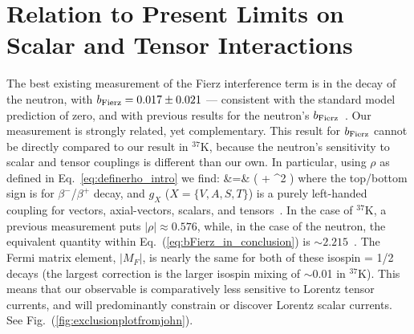 \section{Relation to Present Limits on Scalar and Tensor Interactions}
\label{sec:scalartensorlimits}
\label{sec:relation_to_other_measurements}
The best existing measurement of the Fierz interference term is in the decay of the neutron, with
\mbox{$b_{\mathrm{Fierz}} = 0.017 \pm 0.021$} --- consistent with the standard model prediction of zero, and with previous results for the neutron's $b_{\mathrm{Fierz}}$~\cite{Saul2020}\cite{UCNAfierz2020}. Our measurement is strongly related, yet complementary.  
%
This result for $b_{\mathrm{Fierz}}$ cannot be directly compared to our result in $^{37}$K, because the neutron's sensitivity to scalar and tensor couplings is different than our own.  In particular, using $\rho$ as defined in Eq.~\ref{eq:definerho_intro}
we find:
%
\bea
\bFierz &=&  \left(  + \rho^2  \right)
\label{eq:bFierz_in_conclusion}
\eea
where the top/bottom sign is for $\beta^-$/$\beta^+$ decay, and $g_X$ ($X = \{ V,A,S,T\} $) is a purely left-handed coupling for vectors, axial-vectors, scalars, and tensors~\cite{jtw}\cite{jtw_coulomb}.
In the case of $^{37}$K, a previous measurement puts $ | \rho | \approx 0.576 $, while, in the case of the neutron, the equivalent quantity within Eq.~(\ref{eq:bFierz_in_conclusion}) is 
$\sim 2.215 $~\cite{NeutronAbeta2018}\cite{Saul2020}\cite{UCNAfierz2020}.
The Fermi matrix element, $|M_F|$, is nearly the same for both of these isospin = 1/2 decays (the largest correction is the larger isospin mixing of $\sim$0.01 in $^{37}$K).
This means that our observable is comparatively less sensitive to Lorentz tensor currents, and will predominantly constrain or discover Lorentz scalar currents.  See Fig.~(\ref{fig:exclusionplotfromjohn}).

